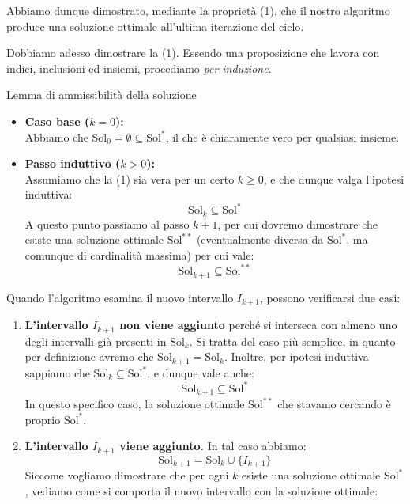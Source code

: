 \documentclass[12pt]{report}
\begin{document}
	Abbiamo dunque dimostrato, mediante la proprietà (1), che il nostro algoritmo produce una soluzione ottimale all'ultima iterazione del ciclo.
	
	Dobbiamo adesso dimostrare la (1). Essendo una proposizione che lavora con indici, inclusioni ed insiemi, procediamo \textit{per induzione}.
	
	\begin{dimostrazione}{Lemma di ammissibilità della soluzione}{}
		\begin{itemize}
			\item \textbf{Caso base ($k = 0$):}\\
			Abbiamo che $\text{Sol}_0 = \emptyset \subseteq \text{Sol}^*$, il che è chiaramente vero per qualsiasi insieme.
			
			\item \textbf{Passo induttivo ($k > 0$):}\\
			Assumiamo che la (1) sia vera per un certo $k \ge 0$, e che dunque valga l'ipotesi induttiva:
			\[
			\text{Sol}_k \subseteq \text{Sol}^*
			\]
			A questo punto passiamo al passo $k+1$, per cui dovremo dimostrare che esiste una soluzione ottimale $\text{Sol}^{**}$ (eventualmente diversa da $\text{Sol}^*$, ma comunque di cardinalità massima) per cui vale:
			\[
			\text{Sol}_{k+1} \subseteq \text{Sol}^{**}
			\]
		\end{itemize}
		
		Quando l'algoritmo esamina il nuovo intervallo $I_{k+1}$, possono verificarsi due casi:
		
		\begin{enumerate}
			\item \textbf{L'intervallo $I_{k+1}$ non viene aggiunto} perché si interseca con almeno uno degli intervalli già presenti in $\text{Sol}_k$.
			Si tratta del caso più semplice, in quanto per definizione avremo che $\text{Sol}_{k+1} = \text{Sol}_k$.
			Inoltre, per ipotesi induttiva sappiamo che $\text{Sol}_k \subseteq \text{Sol}^*$, e dunque vale anche:
			\[
			\text{Sol}_{k+1} \subseteq \text{Sol}^*
			\]
			In questo specifico caso, la soluzione ottimale $\text{Sol}^{**}$ che stavamo cercando è proprio $\text{Sol}^*$.
			
			\item \textbf{L'intervallo $I_{k+1}$ viene aggiunto.} In tal caso abbiamo:
			\[
			\text{Sol}_{k+1} = \text{Sol}_k \cup \{I_{k+1}\}
			\]
			Siccome vogliamo dimostrare che per ogni $k$ esiste una soluzione ottimale $\text{Sol}^*$, vediamo come si comporta il nuovo intervallo con la soluzione ottimale:
			

\end{enumerate}
\end{dimostrazione}
\end{document}
